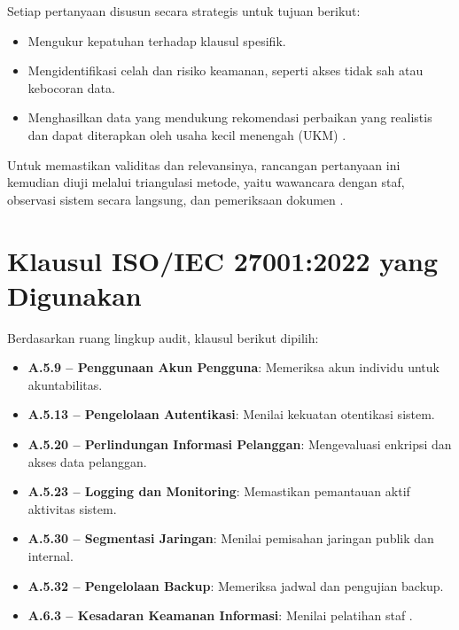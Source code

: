 \documentclass[12pt, a4paper]{report}
\begin{document}
Setiap pertanyaan disusun secara strategis untuk tujuan berikut:
\begin{itemize}
    \item Mengukur kepatuhan terhadap klausul spesifik.
    \item Mengidentifikasi celah dan risiko keamanan, seperti akses tidak sah atau kebocoran data.
    \item Menghasilkan data yang mendukung rekomendasi perbaikan yang realistis dan dapat diterapkan oleh usaha kecil menengah (UKM) \citep{rokhman2018implementasi}.
\end{itemize}
Untuk memastikan validitas dan relevansinya, rancangan pertanyaan ini kemudian diuji melalui triangulasi metode, yaitu wawancara dengan staf, observasi sistem secara langsung, dan pemeriksaan dokumen \citep{permatasari2023manajemen, iso27001}.
\section{Klausul ISO/IEC 27001:2022 yang Digunakan}
Berdasarkan ruang lingkup audit, klausul berikut dipilih:
\begin{itemize}
    \item \textbf{A.5.9 – Penggunaan Akun Pengguna}: Memeriksa akun individu untuk akuntabilitas.
    \item \textbf{A.5.13 – Pengelolaan Autentikasi}: Menilai kekuatan otentikasi sistem.
    \item \textbf{A.5.20 – Perlindungan Informasi Pelanggan}: Mengevaluasi enkripsi dan akses data pelanggan.
    \item \textbf{A.5.23 – Logging dan Monitoring}: Memastikan pemantauan aktif aktivitas sistem.
    \item \textbf{A.5.30 – Segmentasi Jaringan}: Menilai pemisahan jaringan publik dan internal.
    \item \textbf{A.5.32 – Pengelolaan Backup}: Memeriksa jadwal dan pengujian backup.
    \item \textbf{A.6.3 – Kesadaran Keamanan Informasi}: Menilai pelatihan staf \citep{iso27001, widodo2022keamanan}.
\end{itemize}


\end{document}
